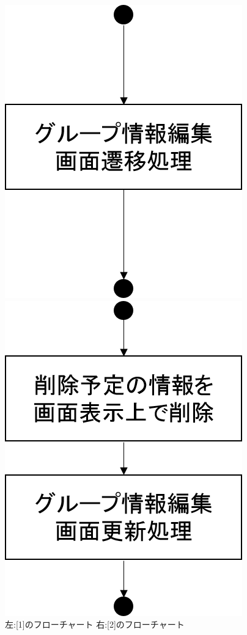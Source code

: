 \begin{figure}[htbp]
 \begin{minipage}{0.5\hsize}
  \begin{center}
   \includegraphics[width=0.45\linewidth,clip]{./img/edit_group/sub1.png}
  \end{center}
 \end{minipage}
 \begin{minipage}{0.5\hsize}
  \begin{center}
   \includegraphics[width=0.45\linewidth,clip]{./img/edit_group/sub2.png}
  \end{center}
 \end{minipage}
 \caption{左:[1]のフローチャート 右:[2]のフローチャート}\label{fig:editgroupflow0}
\end{figure}

